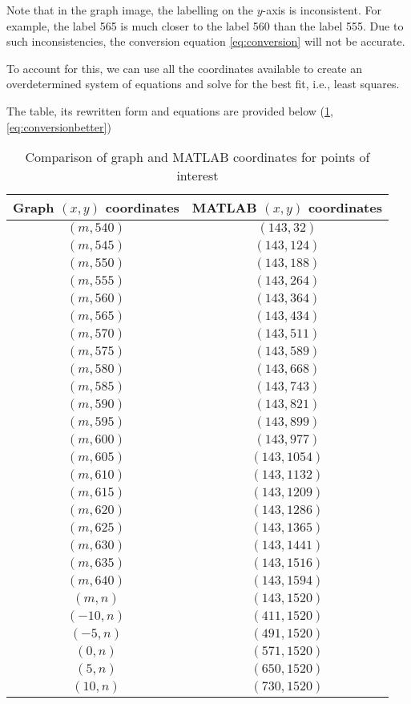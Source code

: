 \documentclass[a4paper]{article}
\begin{document}
Note that in the graph image, the labelling on the $y$-axis is inconsistent. For example, the label 565 is much closer to the label 560 than the label 555.
Due to such inconsistencies, the conversion equation \ref{eq:conversion} will not be accurate.

To account for this, we can use all the coordinates available to create an overdetermined system of equations and solve for the best fit, i.e., least squares.

The table, its rewritten form and equations are provided below (\ref{tab:poibetter}, \ref{eq:conversionbetter})
\begin{table}
\centering
\begin{tabular}{cc}
	Graph $(x,y)$ coordinates & MATLAB $(x,y)$ coordinates\\\hline
	$(m, 540)$ & $(143, 32)$\\
	$(m, 545)$ & $(143, 124)$\\
	$(m, 550)$ & $(143, 188)$\\
	$(m, 555)$ & $(143, 264)$\\
	$(m, 560)$ & $(143, 364)$\\
	$(m, 565)$ & $(143, 434)$\\
	$(m, 570)$ & $(143, 511)$\\
	$(m, 575)$ & $(143, 589)$\\
	$(m, 580)$ & $(143, 668)$\\
	$(m, 585)$ & $(143, 743)$\\
	$(m, 590)$ & $(143, 821)$\\
	$(m, 595)$ & $(143, 899)$\\
	$(m, 600)$ & $(143, 977)$\\
	$(m, 605)$ & $(143, 1054)$\\
	$(m, 610)$ & $(143, 1132)$\\
	$(m, 615)$ & $(143, 1209)$\\
	$(m, 620)$ & $(143, 1286)$\\
	$(m, 625)$ & $(143, 1365)$\\
	$(m, 630)$ & $(143, 1441)$\\
	$(m, 635)$ & $(143, 1516)$\\
	$(m, 640)$ & $(143, 1594)$\\
	$(m, n)$ & $(143, 1520)$\\
	$(-10, n)$ & $(411, 1520)$\\
	$(-5, n)$ & $(491, 1520)$\\
	$(0, n)$ & $(571, 1520)$\\
	$(5, n)$ & $(650, 1520)$\\
	$(10, n)$ & $(730, 1520)$
\end{tabular}
\caption{Comparison of graph and MATLAB coordinates for points of interest}
\label{tab:poibetter}
\end{table}
\end{document}
